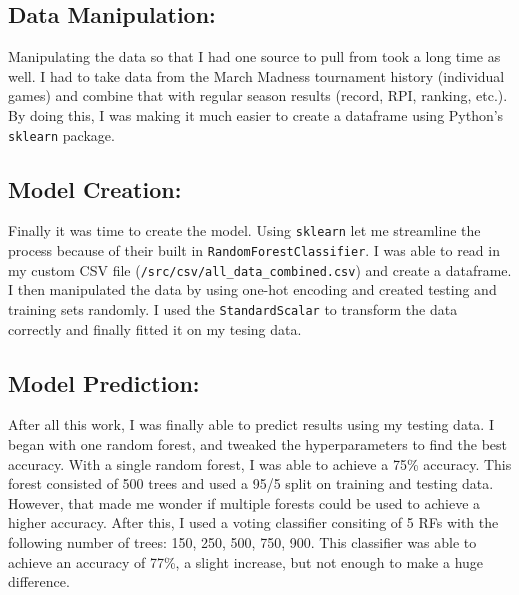 \documentclass[10pt]{article}
\begin{document}
    \subsection{\textbf{Data Manipulation:}}
        Manipulating the data so that I had one source to pull from took a long time as well.  I had to take data from the March Madness tournament history (individual games) and combine that with regular season results (record, RPI, ranking, etc.).  By doing this, I was making it much easier to create a dataframe using Python's \texttt{sklearn} package.
    \subsection{\textbf{Model Creation:}}
        Finally it was time to create the model.  Using \texttt{sklearn} let me streamline the process because of their built in \texttt{RandomForestClassifier}.  I was able to read in my custom CSV file (\texttt{/src/csv/all\_data\_combined.csv}) and create a dataframe.  I then manipulated the data by using one-hot encoding and created testing and training sets randomly.  I used the \texttt{StandardScalar} to transform the data correctly and finally fitted it on my tesing data.
    \subsection{\textbf{Model Prediction:}}
        After all this work, I was finally able to predict results using my testing data.  I began with one random forest, and tweaked the hyperparameters to find the best accuracy.  With a single random forest, I was able to achieve a 75\% accuracy.  This forest consisted of 500 trees and used a 95/5 split on training and testing data.\\
        However, that made me wonder if multiple forests could be used to achieve a higher accuracy.  After this, I used a voting classifier consiting of 5 RFs with the following number of trees: 150, 250, 500, 750, 900.  This classifier was able to achieve an accuracy of 77\%, a slight increase, but not enough to make a huge difference.
\end{document}

